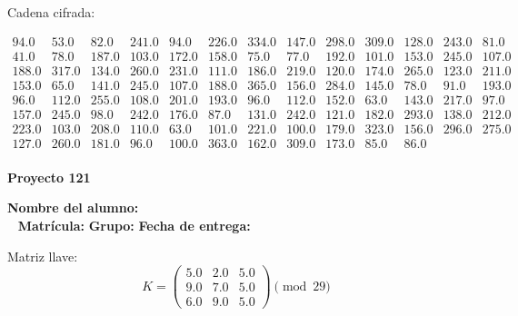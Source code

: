 \documentclass[12pt]{article}
\begin{document}
Cadena cifrada:
\begin{center}
$\begin{array}{lllllllllllll}
94.0 & 53.0 & 82.0 & 241.0 & 94.0 & 226.0 & 334.0 & 147.0 & 298.0 & 309.0 & 128.0 & 243.0 & 81.0\\
41.0 & 78.0 & 187.0 & 103.0 & 172.0 & 158.0 & 75.0 & 77.0 & 192.0 & 101.0 & 153.0 & 245.0 & 107.0\\
188.0 & 317.0 & 134.0 & 260.0 & 231.0 & 111.0 & 186.0 & 219.0 & 120.0 & 174.0 & 265.0 & 123.0 & 211.0\\
153.0 & 65.0 & 141.0 & 245.0 & 107.0 & 188.0 & 365.0 & 156.0 & 284.0 & 145.0 & 78.0 & 91.0 & 193.0\\
96.0 & 112.0 & 255.0 & 108.0 & 201.0 & 193.0 & 96.0 & 112.0 & 152.0 & 63.0 & 143.0 & 217.0 & 97.0\\
157.0 & 245.0 & 98.0 & 242.0 & 176.0 & 87.0 & 131.0 & 242.0 & 121.0 & 182.0 & 293.0 & 138.0 & 212.0\\
223.0 & 103.0 & 208.0 & 110.0 & 63.0 & 101.0 & 221.0 & 100.0 & 179.0 & 323.0 & 156.0 & 296.0 & 275.0\\
127.0 & 260.0 & 181.0 & 96.0 & 100.0 & 363.0 & 162.0 & 309.0 & 173.0 & 85.0 & 86.0\\
\end{array}$
\end{center}

\newpage


\textbf{Proyecto 121}

\textbf{Nombre del alumno:} \underline{\hspace{13cm}}\\\
\vspace{1cm}
\textbf{Matrícula:} \underline{\hspace{4cm}} \hspace{1cm}
\textbf{Grupo:} \underline{\hspace{2cm}}
\textbf{Fecha de entrega:} \underline{\hspace{2cm}}

\medskip

Matriz llave:
\[
K = \begin{pmatrix}
5.0 & 2.0 & 5.0\\
9.0 & 7.0 & 5.0\\
6.0 & 9.0 & 5.0
\end{pmatrix} \pmod{29}
\]
\end{document}
